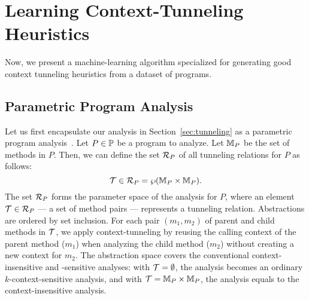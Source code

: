\section{Learning Context-Tunneling Heuristics}\label{tunneling:learning}

Now, we present a machine-learning algorithm specialized for
generating good context tunneling heuristics from a dataset
of programs.




\subsection{Parametric Program Analysis} \label{tunneling:setting}

Let us first encapsulate our analysis in Section~\ref{sec:tunneling}
as a parametric program analysis~\cite{Liang2011learning}.  Let
$P \in \mathbb{P}$ be a program to analyze. Let ${\mathbb{M}}_P$ be the set
of methods in $P$.  Then, we can define the set $\mathcal{R}_P$ of all
tunneling relations for $P$ as follows:
\[
 \mathcal{T} \in \mathcal{R}_P = \wp({\mathbb{M}}_P \times {\mathbb{M}}_P).
\]
The set $\mathcal{R}_P$ forms the parameter space of the analysis for $P$,
where an element $\mathcal{T} \in \mathcal{R}_P$ --- a set of
method pairs --- represents a tunneling relation.  Abstractions are
ordered by set inclusion.  For each pair $(m_1,m_2)$ of parent and
child methods in $\mathcal{T}$, we apply context-tunneling by
reusing the calling context of the parent method ($m_1$) when analyzing the
child method ($m_2$) without creating a new context for $m_2$.  The abstraction
space covers the conventional context-insensitive and -sensitive
analyses: with $\mathcal{T} = \emptyset$, the analysis becomes
an ordinary $k$-context-sensitive analysis, and with
$\mathcal{T} = {\mathbb{M}}_P \times {\mathbb{M}}_P$, the analysis
equals to the context-insensitive analysis.

